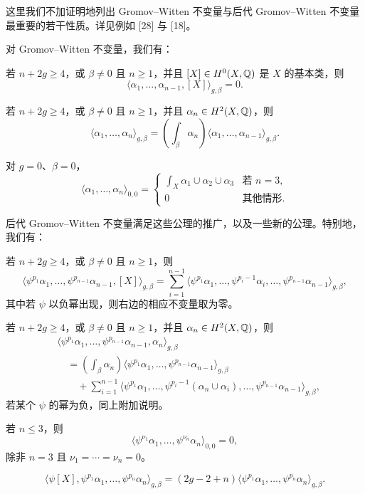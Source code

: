 这里我们不加证明地列出 Gromov–Witten 不变量与后代 Gromov–Witten 不变量最重要的若干性质。详见例如 [28] 与 [18]。

对 Gromov–Witten 不变量，我们有：

若 $n+2g\ge 4$，或 $\beta\neq 0$ 且 $n\ge 1$，并且 $[X]\in H^0(X,\mathbb{Q})$ 是 $X$ 的基本类，则
\[
\langle\alpha_1,\dots,\alpha_{n-1},[X]\rangle_{g,\beta}=0.
\]

若 $n+2g\ge 4$，或 $\beta\neq 0$ 且 $n\ge 1$，并且 $\alpha_n\in H^2(X,\mathbb{Q})$，则
\[
\langle\alpha_1,\dots,\alpha_n\rangle_{g,\beta}=\left(\int_{\beta}\alpha_n\right)\langle\alpha_1,\dots,\alpha_{n-1}\rangle_{g,\beta}.
\]

对 $g=0$、$\beta=0$，
\[
\langle\alpha_1,\dots,\alpha_n\rangle_{0,0}=
\begin{cases}
\displaystyle\int_X\alpha_1\cup\alpha_2\cup\alpha_3 & \text{若 } n=3,\\[4pt]
0 & \text{其他情形}.
\end{cases}
\]

后代 Gromov–Witten 不变量满足这些公理的推广，以及一些新的公理。特别地，我们有：

若 $n+2g\ge 4$，或 $\beta\neq 0$ 且 $n\ge 1$，则
\[
\langle\psi^{p_1}\alpha_1,\dots,\psi^{p_{n-1}}\alpha_{n-1},[X]\rangle_{g,\beta}=\sum_{i=1}^{n-1}\langle\psi^{p_1}\alpha_1,\dots,\psi^{p_i-1}\alpha_i,\dots,\psi^{p_{n-1}}\alpha_{n-1}\rangle_{g,\beta},
\]
其中若 $\psi$ 以负幂出现，则右边的相应不变量取为零。

若 $n+2g\ge 4$，或 $\beta\neq 0$ 且 $n\ge 1$，并且 $\alpha_n\in H^2(X,\mathbb{Q})$，则
\begin{align*}
&\langle\psi^{p_1}\alpha_1,\dots,\psi^{p_{n-1}}\alpha_{n-1},\alpha_n\rangle_{g,\beta}\\
&\quad=\left(\int_{\beta}\alpha_n\right)\langle\psi^{p_1}\alpha_1,\dots,\psi^{p_{n-1}}\alpha_{n-1}\rangle_{g,\beta}\\
&\qquad+\sum_{i=1}^{n-1}\langle\psi^{p_1}\alpha_1,\dots,\psi^{p_i-1}(\alpha_n\cup\alpha_i),\dots,\psi^{p_{n-1}}\alpha_{n-1}\rangle_{g,\beta},
\end{align*}
若某个 $\psi$ 的幂为负，同上附加说明。

若 $n\le 3$，则
\[
\langle\psi^{\nu_1}\alpha_1,\dots,\psi^{\nu_n}\alpha_n\rangle_{0,0}=0,
\]
除非 $n=3$ 且 $\nu_1=\cdots=\nu_n=0$。

\[
\langle\psi[X],\psi^{p_1}\alpha_1,\dots,\psi^{p_n}\alpha_n\rangle_{g,\beta}=(2g-2+n)\langle\psi^{p_1}\alpha_1,\dots,\psi^{p_n}\alpha_n\rangle_{g,\beta}.
\]


